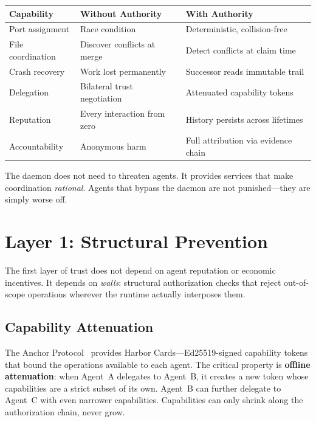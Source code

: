 \documentclass[11pt,a4paper]{article}
\theoremstyle{definition}
\theoremstyle{remark}
\begin{document}
\begin{table}[H]
\centering
{}
\label{tab:consent}
\begin{tabularx}{\textwidth}{@{}l >{\raggedright\arraybackslash}X >{\raggedright\arraybackslash}X@{}}
\toprule
\textbf{Capability} & \textbf{Without Authority} & \textbf{With Authority} \\
\midrule
Port assignment & Race condition & Deterministic, collision-free \\
File coordination & Discover conflicts at merge & Detect conflicts at claim time \\
Crash recovery & Work lost permanently & Successor reads immutable trail \\
Delegation & Bilateral trust negotiation & Attenuated capability tokens \\
Reputation & Every interaction from zero & History persists across lifetimes \\
Accountability & Anonymous harm & Full attribution via evidence chain \\
\bottomrule
\end{tabularx}
\end{table}

The daemon does not need to threaten agents. It provides services that make coordination \emph{rational}. Agents that bypass the daemon are not punished---they are simply worse off.

\section{Layer 1: Structural Prevention}\label{sec:structural}

The first layer of trust does not depend on agent reputation or economic incentives. It depends on \emph{walls}: structural authorization checks that reject out-of-scope operations wherever the runtime actually interposes them.

\subsection{Capability Attenuation}

The Anchor Protocol~ provides Harbor Cards---Ed25519-signed capability tokens that bound the operations available to each agent. The critical property is \textbf{offline attenuation}: when Agent~A delegates to Agent~B, it creates a new token whose capabilities are a strict subset of its own. Agent~B can further delegate to Agent~C with even narrower capabilities. Capabilities can only shrink along the authorization chain, never grow.
\end{document}
